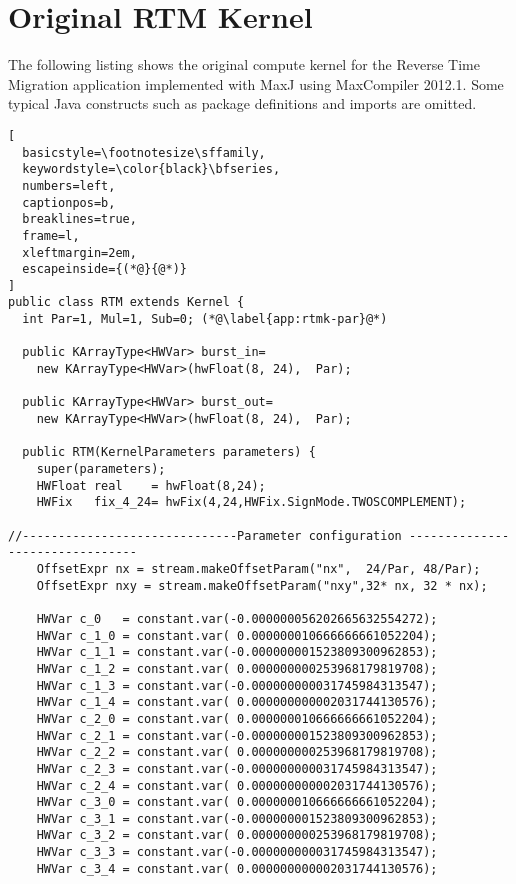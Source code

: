 \chapter{Original RTM Kernel}
\label{app:rtm-kernel}
The following listing shows the original compute kernel for the
Reverse Time Migration application implemented with MaxJ using
MaxCompiler 2012.1. Some typical Java constructs such as package
definitions and imports are omitted.

\begin{lstlisting}[
  basicstyle=\footnotesize\sffamily,
  keywordstyle=\color{black}\bfseries,
  numbers=left,
  captionpos=b,
  breaklines=true,
  frame=l,
  xleftmargin=2em,
  escapeinside={(*@}{@*)}
]
public class RTM extends Kernel {
  int Par=1, Mul=1, Sub=0; (*@\label{app:rtmk-par}@*)

  public KArrayType<HWVar> burst_in=
    new KArrayType<HWVar>(hwFloat(8, 24),  Par);

  public KArrayType<HWVar> burst_out=
    new KArrayType<HWVar>(hwFloat(8, 24),  Par);

  public RTM(KernelParameters parameters) {
    super(parameters);
    HWFloat real    = hwFloat(8,24);
    HWFix   fix_4_24= hwFix(4,24,HWFix.SignMode.TWOSCOMPLEMENT);

//------------------------------Parameter configuration --------------------------------
    OffsetExpr nx = stream.makeOffsetParam("nx",  24/Par, 48/Par);
    OffsetExpr nxy = stream.makeOffsetParam("nxy",32* nx, 32 * nx);

    HWVar c_0   = constant.var(-0.000000056202665632554272);
    HWVar c_1_0 = constant.var( 0.000000010666666661052204);
    HWVar c_1_1 = constant.var(-0.000000001523809300962853);
    HWVar c_1_2 = constant.var( 0.000000000253968179819708);
    HWVar c_1_3 = constant.var(-0.000000000031745984313547);
    HWVar c_1_4 = constant.var( 0.000000000002031744130576);
    HWVar c_2_0 = constant.var( 0.000000010666666661052204);
    HWVar c_2_1 = constant.var(-0.000000001523809300962853);
    HWVar c_2_2 = constant.var( 0.000000000253968179819708);
    HWVar c_2_3 = constant.var(-0.000000000031745984313547);
    HWVar c_2_4 = constant.var( 0.000000000002031744130576);
    HWVar c_3_0 = constant.var( 0.000000010666666661052204);
    HWVar c_3_1 = constant.var(-0.000000001523809300962853);
    HWVar c_3_2 = constant.var( 0.000000000253968179819708);
    HWVar c_3_3 = constant.var(-0.000000000031745984313547);
    HWVar c_3_4 = constant.var( 0.000000000002031744130576);


\end{lstlisting}

